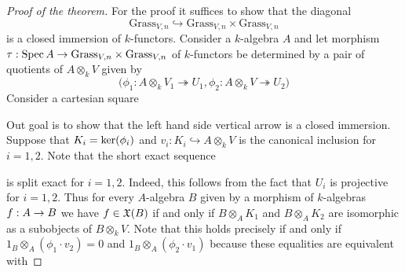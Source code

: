 \begin{proof}[Proof of the theorem]
For the proof it suffices to show that the diagonal
$$\mathrm{Grass}_{V,n}\hookrightarrow \mathrm{Grass}_{V,n}\times \mathrm{Grass}_{V,n}$$
is a closed immersion of $k$-functors. Consider a $k$-algebra $A$ and let morphism $\tau:\mathrm{Spec}\, A\rightarrow \mathrm{Grass}_{V,n} \times \mathrm{Grass}_{V,n}$ of $k$-functors be determined by a pair of quotients of $A\otimes_kV$ given by
$$\big(\phi_1:A\otimes_kV_1\twoheadrightarrow U_1,\phi_2:A\otimes_kV\twoheadrightarrow U_2\big)$$
Consider a cartesian square
\begin{center}
\end{center}
Out goal is to show that the left hand side vertical arrow is a closed immersion. Suppose that $K_i = \mathrm{ker}(\phi_i)$ and $v_i:K_i\hookrightarrow A\otimes_kV$ is the canonical inclusion for $i=1,2$. Note that the short exact sequence
\begin{center}
\end{center}
is split exact for $i=1,2$. Indeed, this follows from the fact that $U_i$ is projective for $i=1,2$. Thus for every $A$-algebra $B$ given by a morphism of $k$-algebras $f:A\rightarrow B$ we have $f\in {\mathfrak X}(B)$ if and only if $B\otimes_AK_1$ and $B\otimes_AK_2$ are isomorphic as a subobjects of $B\otimes_kV$. Note that this holds precisely if and only if $1_B\otimes_A\left(\phi_1\cdot v_2\right) = 0$ and $1_B\otimes_A\left(\phi_2\cdot v_1\right)$ because these equalities are equivalent with

\end{proof}

